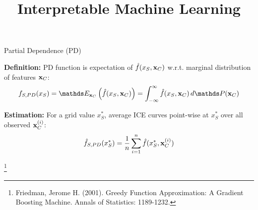\documentclass[11pt,compress,t,notes=noshow, aspectratio=169, xcolor=table]{beamer}
\title{Interpretable Machine Learning}
\date{}
\begin{document}
\newcommand{\titlefigure}{figure/pdp_bike}
\newcommand{\learninggoals}{
\item Understand PD plots and their relation to ICE plots
\item Understand how to interpret ICE curves and PD plots
}


\begin{frame}{Partial Dependence (PD)}

\textbf{Definition:} PD function is expectation of $\fh(x_S, \xv_C)$ w.r.t. marginal distribution of features $\xv_C$:
$$f_{S, PD}(x_S) = \E_{\xv_C} \left( \fh(x_S, \xv_C) \right) = \int_{-\infty}^{\infty} \fh(x_S, \xv_C) \, d\P(\xv_C)$$

\textbf{Estimation:} For a grid value $x_S^*$, average ICE curves point-wise at $x_S^*$ over all observed $\xv_C^{(i)}$:
$$\fh_{S, PD}(x_S^*) = \frac{1}{n} \sum_{i=1}^n \fh(x_S^*, \xv_C^{(i)})$$


\footnote[frame]{Friedman, Jerome H. (2001). Greedy Function Approximation: A Gradient Boosting Machine. Annals of Statistics: 1189-1232.}
\end{frame}


\end{document}
